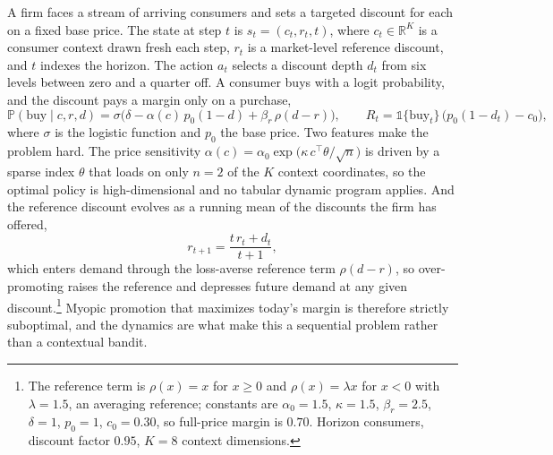 A firm faces a stream of arriving consumers and sets a targeted discount for each on a fixed base price. The state at step $t$ is $s_t=(c_t,r_t,t)$, where $c_t\in\mathbb{R}^{K}$ is a consumer context drawn fresh each step, $r_t$ is a market-level reference discount, and $t$ indexes the horizon. The action $a_t$ selects a discount depth $d_t$ from six levels between zero and a quarter off. A consumer buys with a logit probability, and the discount pays a margin only on a purchase,
\begin{equation}
\mathbb{P}(\text{buy}\mid c,r,d)=\sigma\!\Big(\delta-\alpha(c)\,p_0(1-d)+\beta_r\,\rho(d-r)\Big),\qquad R_t=\mathbb{1}\{\text{buy}_t\}\,\big(p_0(1-d_t)-c_0\big),
\end{equation}
where $\sigma$ is the logistic function and $p_0$ the base price. Two features make the problem hard. The price sensitivity $\alpha(c)=\alpha_0\exp\!\big(\kappa\,c^{\top}\theta/\sqrt{n}\big)$ is driven by a sparse index $\theta$ that loads on only $n=2$ of the $K$ context coordinates, so the optimal policy is high-dimensional and no tabular dynamic program applies. And the reference discount evolves as a running mean of the discounts the firm has offered,
\begin{equation}
r_{t+1}=\frac{t\,r_t+d_t}{t+1},
\end{equation}
which enters demand through the loss-averse reference term $\rho(d-r)$, so over-promoting raises the reference and depresses future demand at any given discount.\footnote{The reference term is $\rho(x)=x$ for $x\ge0$ and $\rho(x)=\lambda x$ for $x<0$ with $\lambda=1.5$, an averaging reference; constants are $\alpha_0=1.5$, $\kappa=1.5$, $\beta_r=2.5$, $\delta=1$, $p_0=1$, $c_0=0.30$, so full-price margin is $0.70$. Horizon \fieldopehorizon{} consumers, discount factor $0.95$, $K=8$ context dimensions.} Myopic promotion that maximizes today's margin is therefore strictly suboptimal, and the dynamics are what make this a sequential problem rather than a contextual bandit.

